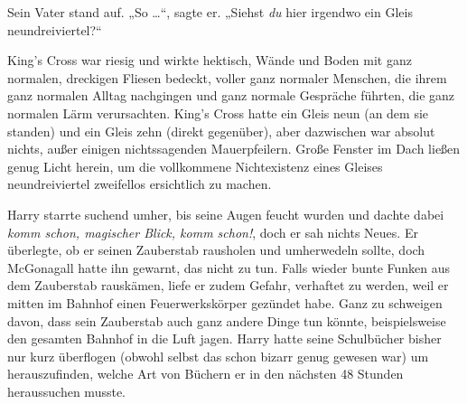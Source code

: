 Sein Vater stand auf.
„So …“, sagte er.
„Siehst \emph{du} hier irgendwo ein Gleis neundreiviertel?“

King’s Cross war riesig und wirkte hektisch, Wände und Boden mit ganz normalen, dreckigen Fliesen bedeckt, voller ganz normaler Menschen, die ihrem ganz normalen Alltag nachgingen und ganz normale Gespräche führten, die ganz normalen Lärm verursachten. King’s Cross hatte ein Gleis neun (an dem sie standen) und ein Gleis zehn (direkt gegenüber), aber dazwischen war absolut nichts, außer einigen nichtssagenden Mauerpfeilern. Große Fenster im Dach ließen genug Licht herein, um die vollkommene Nichtexistenz eines Gleises neundreiviertel zweifellos ersichtlich zu machen.

Harry starrte suchend umher, bis seine Augen feucht wurden und dachte dabei \emph{komm schon, magischer Blick, komm schon!}, doch er sah nichts Neues. Er überlegte, ob er seinen Zauberstab rausholen und umherwedeln sollte, doch McGonagall hatte ihn gewarnt, das nicht zu tun. Falls wieder bunte Funken aus dem Zauberstab rauskämen, liefe er zudem Gefahr, verhaftet zu werden, weil er mitten im Bahnhof einen Feuerwerkskörper gezündet habe. Ganz zu schweigen davon, dass sein Zauberstab auch ganz andere Dinge tun könnte, beispielsweise den gesamten Bahnhof in die Luft jagen. Harry hatte seine Schulbücher bisher nur kurz überflogen (obwohl selbst das schon bizarr genug gewesen war) um herauszufinden, welche Art von Büchern er in den nächsten 48 Stunden heraussuchen musste.


